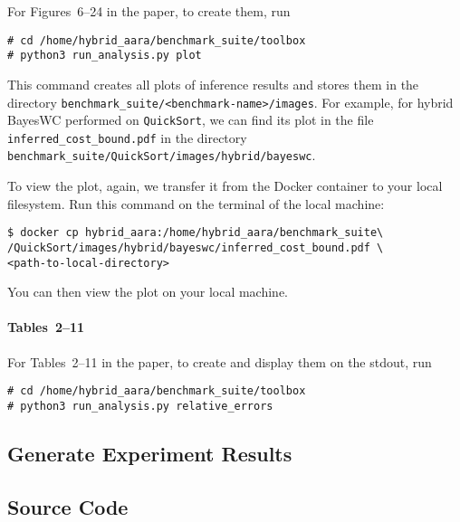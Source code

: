 For Figures~6--24 in the paper, to create them, run
\begin{verbatim}
# cd /home/hybrid_aara/benchmark_suite/toolbox
# python3 run_analysis.py plot
\end{verbatim}
%
This command creates all plots of inference results and stores them in the
directory \texttt{benchmark\_suite/<benchmark-name>/images}.
%
For example, for hybrid BayesWC performed on \texttt{QuickSort}, we can
find its plot in the file \texttt{inferred\_cost\_bound.pdf} in the directory
\texttt{benchmark\_suite/QuickSort/images/hybrid/bayeswc}.

To view the plot, again, we transfer it from the Docker container to your local
filesystem.
%
Run this command on the terminal of the local machine:
\begin{verbatim}
$ docker cp hybrid_aara:/home/hybrid_aara/benchmark_suite\
/QuickSort/images/hybrid/bayeswc/inferred_cost_bound.pdf \
<path-to-local-directory>
\end{verbatim}
%
You can then view the plot on your local machine.

\paragraph{Tables~2--11}

For Tables~2--11 in the paper, to create and display them on the stdout, run
\begin{verbatim}
# cd /home/hybrid_aara/benchmark_suite/toolbox
# python3 run_analysis.py relative_errors
\end{verbatim}

\subsection{Generate Experiment Results}
\label{sec:generate experiment results}

\subsection{Source Code}


